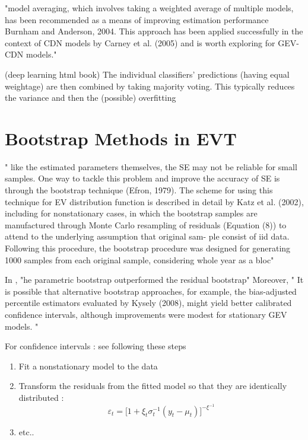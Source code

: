 \documentclass[11pt,a4paper,openany ]{book}
\begin{document}
"model averaging, which involves taking a weighted average of
multiple models, has been recommended as a means of
improving estimation performance Burnham and Anderson, 2004. This approach has been applied successfully
in the context of CDN models by Carney et al. (2005)
and is worth exploring for GEV-CDN models."


\citet[pp.256-267]{Goodfellow-et-al-2016}  (deep learning html book)    The  individual  classifiers’  predictions  (having
equal  weightage)  are  then  combined  by  taking  majority voting. This typically reduces the variance and then the (possible) overfitting






\section{Bootstrap Methods in EVT}

" like
the estimated parameters themselves, the SE may not be
reliable for small samples. One way to tackle this problem and improve the accuracy of SE is through the bootstrap technique (Efron, 1979). The scheme for using this technique for EV distribution  function is described in detail by Katz et al. (2002), including for nonstationary cases,
in which the bootstrap samples are manufactured through
Monte  Carlo  resampling  of  residuals  (Equation (8))  to attend  to  the  underlying  assumption  that  original  sam-
ple  consist  of  iid  data.  Following  this procedure,  the bootstrap  procedure  was  designed  for  generating  1000
samples  from  each  original  sample,  considering  whole year  as  a  bloc"


In \citet{cannon_flexible_2010}, "he parametric bootstrap outperformed the residual bootstrap"
Moreover, " It is possible that alternative bootstrap approaches, for example, the bias-adjusted percentile estimators evaluated by Kysely
(2008), might yield better calibrated confidence intervals, although improvements were modest for stationary GEV models. "


For confidence intervals : see \citet[pp.681]{cannon_flexible_2010} 
following these steps

\begin{enumerate}
	\item Fit a nonstationary model to the data
	\item Transform the residuals from the fitted model so that they are identically distributed :
	\begin{equation}
	\varepsilon_t=\bigg[1+\xi_t\sigma^{-1}_t(y_t-\mu_t)\bigg]^{-\xi^{-1}}
	\end{equation}
	\item etc..
\end{enumerate}
\end{document}
